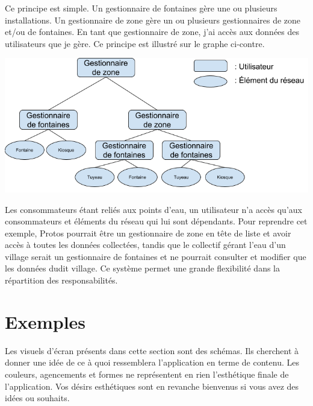 \documentclass[a4paper, 11pt]{article}
\begin{document}
  \vspace*{10px} %
  \begin{minipage}{0.45\textwidth}
    Ce principe est simple. Un gestionnaire de fontaines gère une ou plusieurs installations. Un gestionnaire de zone gère un ou plusieurs gestionnaires de zone et/ou de fontaines. En tant que gestionnaire de zone, j'ai accès aux données des utilisateurs que je gère. Ce principe est illustré sur le graphe ci-contre.
  \end{minipage}
  \begin{minipage}{0.48\textwidth}
    \includegraphics[width=\textwidth]{Cahier_des_Charges/principe_hierarchique}
  \end{minipage}
  \vspace*{10px} %

  Les consommateurs étant reliés aux points d'eau, un utilisateur n'a accès qu'aux consommateurs et éléments du réseau qui lui sont dépendants. Pour reprendre cet exemple, Protos pourrait être un gestionnaire de zone en tête de liste et avoir accès à toutes les données collectées, tandis que le collectif gérant l'eau d'un village serait un gestionnaire de fontaines et ne pourrait consulter et modifier que les données dudit village. Ce système permet une grande flexibilité dans la répartition des responsabilités.


\section{Exemples}
  \begin{shaded}
    Les visuels d'écran présents dans cette section sont des schémas. Ils cherchent à donner une idée de ce à quoi ressemblera l'application en terme de contenu. Les couleurs, agencements et formes ne représentent en rien l'esthétique finale de l'application. Vos désirs esthétiques sont en revanche bienvenus si vous avez des idées ou souhaits.
  \end{shaded}
\end{document}
